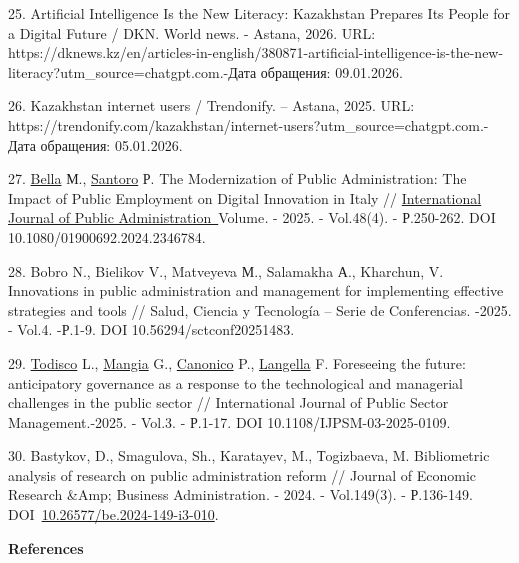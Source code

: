 \begin{refs}
25. Artificial Intelligence Is the New Literacy: Kazakhstan Prepares Its
People for a Digital Future / DKN. World news. - Astana, 2026. URL:
https://dknews.kz/en/articles-in-english/380871-artificial-intelligence-is-the-new-literacy?utm\_source=chatgpt.com.-Дата
обращения: 09.01.2026.

26. Kazakhstan internet users / Trendonify. -- Astana, 2025. URL:
https://trendonify.com/kazakhstan/internet-users?utm\_source=chatgpt.com.-
Дата обращения: 05.01.2026.

27. \href{https://www.tandfonline.com/author/la+Bella\%2C+Marco+V+L}{Bella}
М.,
\href{https://www.tandfonline.com/author/Santoro\%2C+Patrizia}{Santoro}
Р. The Modernization of Public Administration: The Impact of Public
Employment on Digital Innovation in Italy //
\href{https://www.tandfonline.com/journals/lpad20}{International
Journal of Public Administration~}Volume\emph{.} - 2025. - Vol.48(4).
- Р.250-262. DOI 10.1080/01900692.2024.2346784.

28. Bobro N., Bielikov V., Matveyeva М., Salamakha А., Kharchun, V.
Innovations in public administration and management for implementing
effective strategies and tools // Salud, Ciencia y Tecnología -- Serie
de Conferencias. -2025. - Vol.4. -Р.1-9. DOI
10.56294/sctconf20251483.

29. \href{javascript:;}{Todisco} L., \href{javascript:;}{Mangia} G.,
\href{javascript:;}{Canonico} P., \href{javascript:;}{Langella} F.
Foreseeing the future: anticipatory governance as a response to the
technological and managerial challenges in the public sector //
International Journal of Public Sector Management.-2025. - Vol.3. -
Р.1-17. DOI 10.1108/IJPSM-03-2025-0109.

30. Bastykov, D., Smagulova, Sh., Karatayev, M., Тogizbaeva, M.
Bibliometric analysis of research on public administration reform //
Journal of Economic Research \&Amp; Business Administration. - 2024. -
Vol.149(3). - Р.136-149.
DOI~\href{https://doi.org/10.26577/be.2024-149-i3-010}{10.26577/be.2024-149-i3-010}.
\end{refs}

\begin{center}
{\bfseries References}
\end{center}

